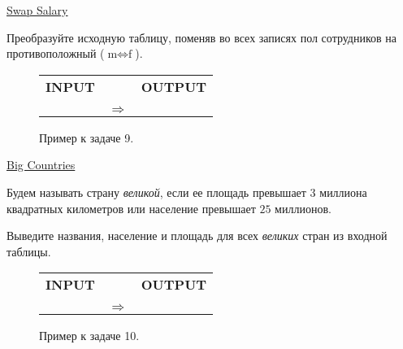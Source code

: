 \documentclass[10pt,fleqn]{article}
\newcounter{example}
\begin{document}
\begin{section}{\href{https://leetcode.com/problems/swap-salary/}{Swap Salary}}

    Преобразуйте исходную таблицу, поменяв во всех записях пол сотрудников на противоположный ($\text{m} \iff \text{f}$).

    \begin{figure}[!h]
        \centering
        \begin{tabular}{ccc}
            \textbf{INPUT} & & \textbf{OUTPUT} \\
            & & \\
             & $\Longrightarrow$ &  \\
         \end{tabular}
         \caption{Пример к задаче 9. \label{fig:task_09}}
    \end{figure}
\end{section}

\newpage
\begin{section}{\href{https://leetcode.com/problems/big-countries/}{Big Countries}}

Будем называть страну \textit{великой}, если ее площадь превышает $3$ миллиона квадратных километров или население превышает $25$ миллионов.

Выведите названия, население и площадь для всех \textit{великих} стран из входной таблицы.

    \begin{figure}[!h]
        \centering
        \begin{tabular}{ccc}
            \textbf{INPUT} & & \textbf{OUTPUT} \\
            & & \\
             & $\Longrightarrow$ &  \\
         \end{tabular}
         \caption{Пример к задаче 10. \label{fig:task_10}}
    \end{figure}
\end{section}
\end{document}

